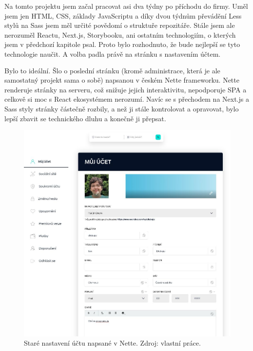 Na tomto projektu jsem začal pracovat asi dva týdny po příchodu do firmy. Uměl jsem jen HTML, CSS, základy JavaScriptu a díky dvou týdnům převádění Less stylů na Sass jsem měl určité povědomí o struktuře repozitáře. Stále jsem ale nerozuměl Reactu, Next.js, Storybooku, ani ostatním technologiím, o kterých jsem v předchozí kapitole psal. Proto bylo rozhodnuto, že bude nejlepší se tyto technologie naučit. A volba padla právě na stránku s nastavením účtem.

Bylo to ideální. Šlo o poslední stránku (kromě administrace, která je ale samostatný projekt sama o sobě) napsanou v českém Nette frameworku. Nette renderuje stránky na serveru, což snižuje jejich interaktivitu, nepodporuje SPA a celkově si moc s React ekosystémem nerozumí\cite{NetteHowAppsWork}. Navíc se s přechodem na Next.js a Sass styly stránky částečně rozbily, a než ji stále kontrolovat a opravovat, bylo lepší zbavit se technického dluhu a konečně ji přepsat.

\begin{figure}[!h]
    \centering
    \includegraphics[width=0.7\linewidth]{obrazky/settings_old.png}
    \caption{Staré nastavení účtu napsané v Nette. Zdroj: vlastní práce.}
\end{figure}